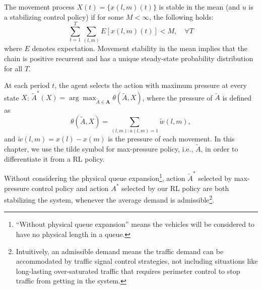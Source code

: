\begin{definition} 
The movement process $X(t) = \{x(l, m)(t)\}$ is stable in the mean (and $u$ is a stabilizing control policy) if for
some $M<\infty$, the following holds:
\begin{equation}
\label{eq:stability}
    \sum_{t=1}^{T}\sum_{(l,m)}E[x(l,m)(t)]<M,\quad\forall T
\end{equation}
where $E$ denotes expectation. Movement stability in the mean implies that the chain is positive recurrent and has a unique steady-state probability distribution for all $T$. 
\end{definition}


\begin{definition} 
\label{def:maxpressure}
At each period $t$, the agent selects the action with maximum pressure at every state $X$: $
\tilde{A}^*(X) = \arg\max_{\tilde{A}\in \pmb{A}}\theta(\tilde{A}, X)$, where the pressure of $\tilde{A}$ is defined as
$$\theta(\tilde{A},X) = \sum_{(l,m):a(l,m)=1} \tilde{w}(l,m),$$
and $\tilde{w}(l,m) = x(l)- x(m)$ is the pressure of each movement. 
In this chapter, we use the tilde symbol for max-pressure policy, i.e., $\tilde{A}$, in order to differentiate it from a RL policy.
\end{definition}

\begin{theorem}
\label{theo:stable} Without considering the physical queue expansion\footnote{``Without physical queue expansion'' means the vehicles will be considered to have no physical length in a queue.}, action $\tilde{A}^*$ selected by max-pressure control policy and action $A^*$ selected by our RL policy are both stabilizing the system, whenever the average demand is admissible\footnote{Intuitively, an admissible demand means the traffic demand can be accommodated by traffic signal control strategies, not including situations like long-lasting over-saturated traffic that requires perimeter control to stop traffic from getting in the system.}.
\end{theorem}

